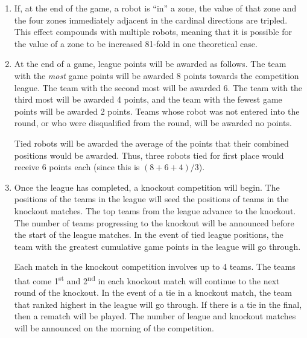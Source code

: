 \begin{enumerate}
\item If, at the end of the game, a robot is ``in'' a zone, the value of that zone and the four zones immediately adjacent in the cardinal directions are tripled. This effect compounds with multiple robots, meaning that it is possible for the value of a zone to be increased 81-fold in one theoretical case.  %

\item At the end of a game, league points will be awarded as follows.
      The team with the \emph{most} game points will be awarded 8 points towards the competition league.
      The team with the second most will be awarded 6.
      The team with the third most will be awarded 4 points, and the team with the fewest game points will be awarded 2 points.
      Teams whose robot was not entered into the round, or who were disqualified from the round, will be awarded no points.

      Tied robots will be awarded the average of the points that their combined positions would be awarded.
      Thus, three robots tied for first place would receive 6 points each (since this is $(8+6+4)/3$).

\item Once the league has completed, a knockout competition will begin.
      The positions of the teams in the league will seed the positions of teams in the knockout matches.
      The top teams from the league advance to the knockout.
      The number of teams progressing to the knockout will be announced before the start of the league matches.
      In the event of tied league positions, the team with the greatest cumulative game points in the league will go through.

      Each match in the knockout competition involves up to 4 teams.
      The teams that come 1\textsuperscript{st} and 2\textsuperscript{nd} in each knockout match will continue to the next round of the knockout.
      In the event of a tie in a knockout match, the team that ranked highest in the league will go through.
      If there is a tie in the final, then a rematch will be played.
      The number of league and knockout matches will be announced on the morning of the competition.

\end{enumerate}
